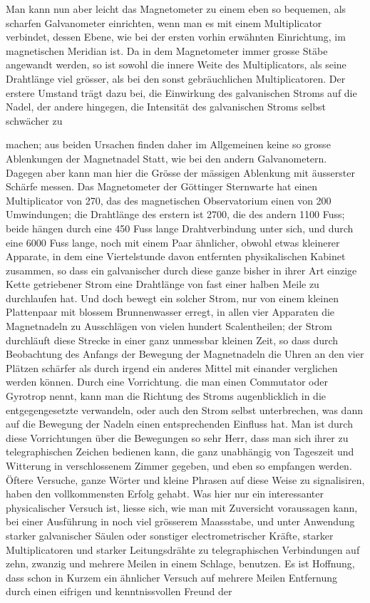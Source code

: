 Man kann nun aber leicht das Magnetometer zu einem eben so bequemen, als scharfen Galvanometer einrichten, wenn man es mit einem Multiplicator verbindet, dessen Ebene, wie bei der ersten vorhin erwähnten Einrichtung, im magnetischen Meridian ist. Da in dem Magnetometer immer grosse Stäbe angewandt werden, so ist sowohl die innere Weite des Multiplicators, als seine Drahtlänge viel grösser, als bei den sonst gebräuchlichen Multiplicatoren. Der erstere Umstand trägt dazu bei, die Einwirkung des galvanischen Stroms auf die Nadel, der andere hingegen, die Intensität des galvanischen Stroms selbst schwächer zu
\par{}
\par\clearpage
{}
\noindent machen; aus beiden Ursachen finden daher im Allgemeinen keine so grosse Ablenkungen der Magnetnadel Statt, wie bei den andern Galvanometern. Dagegen aber kann man hier die Grösse der mässigen Ablenkung mit äusserster Schärfe messen. Das Magnetometer der Göttinger Sternwarte hat einen Multiplicator von 270, das des magnetischen Observatorium einen von 200 Umwindungen; die Drahtlänge des erstern ist 2700, die des andern 1100 Fuss; beide hängen durch eine 450 Fuss lange Drahtverbindung unter sich, und durch eine 6000 Fuss lange, noch mit einem Paar ähnlicher, obwohl etwas kleinerer Apparate, in dem eine Viertelstunde davon entfernten physikalischen Kabinet zusammen, so dass ein galvanischer durch diese ganze bisher in ihrer Art einzige Kette getriebener Strom eine Drahtlänge von fast einer halben Meile zu durchlaufen hat. Und doch bewegt ein solcher Strom, nur von einem kleinen Plattenpaar mit blossem Brunnenwasser erregt, in allen vier Apparaten die Magnetnadeln zu Ausschlägen von vielen hundert Scalentheilen; der Strom durchläuft diese Strecke in einer ganz unmessbar kleinen Zeit, so dass durch Beobachtung des Anfangs der Bewegung der Magnetnadeln die Uhren an den vier Plätzen schärfer als durch irgend ein anderes Mittel mit einander verglichen werden können. Durch eine Vorrichtung. die man einen Commutator oder Gyrotrop nennt, kann man die Richtung des Stroms augenblicklich in die entgegengesetzte verwandeln, oder auch den Strom selbst unterbrechen, was dann auf die Bewegung der Nadeln einen entsprechenden Einfluss hat. Man ist durch diese Vorrichtungen über die Bewegungen so sehr Herr, dass man sich ihrer zu telegraphischen Zeichen bedienen kann, die ganz unabhängig von Tageszeit und Witterung in verschlossenem Zimmer gegeben, und eben so empfangen werden. Öftere Versuche, ganze Wörter und kleine Phrasen auf diese Weise zu signalisiren, haben den vollkommensten Erfolg gehabt. Was hier nur ein interessanter physicalischer Versuch ist, liesse sich, wie man mit Zuversicht voraussagen kann, bei einer Ausführung in noch viel grösserem Maassstabe, und unter Anwendung starker galvanischer Säulen oder sonstiger electrometrischer Kräfte, starker Multiplicatoren und starker Leitungsdrähte zu telegraphischen Verbindungen auf zehn, zwanzig und mehrere Meilen in einem Schlage, benutzen. Es ist Hoffnung, dass schon in Kurzem ein ähnlicher Versuch auf mehrere Meilen Entfernung durch einen eifrigen und kenntnissvollen Freund der 